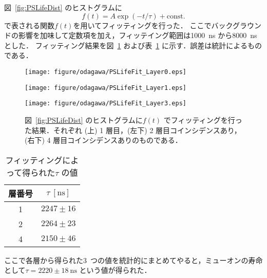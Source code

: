 図~\ref{fig:PSLifeDist} のヒストグラムに%
\begin{equation}
f(t) = A \exp(-t / \tau) + \mathrm{const.}
\label{eq:PSLifeFitFunc}
\end{equation}
で表される関数$f(t)$を用いてフィッティングを行った．
ここでバックグラウンドの影響を加味して定数項を加え，フィッテイング範囲は1000~ns から8000~ns とした．
フィッティング結果を図~\ref{fig:PSLifeFit} および表~\ref{tab:PSLifetime} に示す．誤差は統計によるものである．
\begin{figure}[h]
	\centering
	\texttt{[image: figure/odagawa/PSLifeFit\_Layer0.eps]}\\
	\begin{minipage}{0.45\textwidth}
	\centering
	\texttt{[image: figure/odagawa/PSLifeFit\_Layer1.eps]}
	\end{minipage}
	\begin{minipage}{0.45\textwidth}
	\centering
	\texttt{[image: figure/odagawa/PSLifeFit\_Layer3.eps]}
	\end{minipage}
	\caption{図~\ref{fig:PSLifeDist} のヒストグラムに$f(t)$ でフィッティングを行った結果．それぞれ (上) 1 層目，(左下) 2 層目コインシデンスあり，(右下) 4 層目コインシデンスありのものである．}
	\label{fig:PSLifeFit}
\end{figure}%
\begin{table}[h]
	\centering
	\caption{フィッティングによって得られた$\tau$ の値}
	\begin{tabular}{cc}\toprule
	層番号 & $\tau~[\mathrm{ns}]$ \\ \midrule
	1 & $2247 \pm 16$ \\
	2 & $2264 \pm 23$ \\
	4 & $2150 \pm 46$ \\ \bottomrule
	\end{tabular}\label{tab:PSLifetime}
\end{table}%

ここで各層から得られた3~つの値を統計的にまとめてやると，ミューオンの寿命として$\tau = 2220 \pm 18~\mathrm{ns}$ という値が得られた．

\newpage

